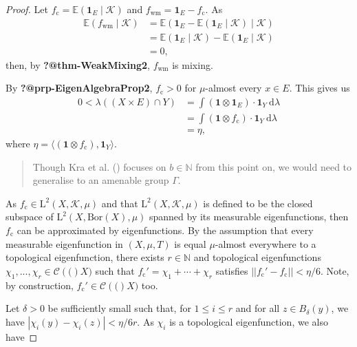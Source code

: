 \documentclass[
  british,
]{article}
\theoremstyle{plain}
\theoremstyle{plain}
\theoremstyle{plain}
\theoremstyle{definition}
\theoremstyle{remark}
\newcommand{\AmenableGroup}{{\Gamma}}
\newcommand{\Borel}[1]{{\text{Bor}({#1})}}
\newcommand{\ContinuousFunctionSpace}[1]{{\mathscr{C}({#1})}}
\newcommand{\Measure}{{\mu}}
\newcommand{\SigmaAlgebra}[1]{{\mathscr{#1}}}
\newcommand{\EigenAlgebra}{{\SigmaAlgebra{K}}}
\begin{document}
\begin{proof}
Let \(f_\text{c}=\mathbb{E}(\boldsymbol{1}_E\mid\EigenAlgebra)\) and
\(f_\text{wm}=\boldsymbol{1}_E-f_\text{c}\). As \begin{align*}
  \mathbb{E}(f_\text{wm}\mid\EigenAlgebra)&=\mathbb{E}(\boldsymbol{1}_E-\mathbb{E}(\boldsymbol{1}_E\mid\EigenAlgebra)\mid\EigenAlgebra)
  \\&=\mathbb{E}(\boldsymbol{1}_E\mid\EigenAlgebra)-\mathbb{E}(\boldsymbol{1}_E\mid\EigenAlgebra)
  \\&=0,
\end{align*} then, by \textbf{?@thm-WeakMixing2}, \(f_\text{wm}\) is
mixing.

By \textbf{?@prp-EigenAlgebraProp2}, \(f_\text{c}>0\) for
\(\Measure\)-almost every \(x\in E\). This gives us \begin{align*}
  0<\lambda\left((X\times E)\cap Y\right)&=\int(\boldsymbol{1}\otimes\boldsymbol{1}_E)\cdot\boldsymbol{1}_Y\ \mathrm{d}\lambda
  \\&=\int(\boldsymbol{1}\otimes f_\text{c})\cdot\boldsymbol{1}_Y\ \mathrm{d}\lambda
  \\&=\eta,
\end{align*} where
\(\eta=\langle(\boldsymbol{1}\otimes f_\text{c}),\boldsymbol{1}_Y \rangle\).

\begin{quote}
Though Kra et al. () focuses on
\(b\in\mathbb{N}\) from this point on, we would need to generalise to an
amenable group \(\AmenableGroup\).
\end{quote}

As \(f_\text{c}\in\text{L}^2(X,\EigenAlgebra,\Measure)\) and that
\(\text{L}^2(X,\EigenAlgebra,\Measure)\) is defined to be the closed
subspace of \(\text{L}^2(X,\Borel{X},\Measure)\) spanned by its
measurable eigenfunctions, then \(f_\text{c}\) can be approximated by
eigenfunctions. By the assumption that every measurable eigenfunction in
\((X,\Measure,T)\) is equal \(\Measure\)-almost everywhere to a
topological eigenfunction, there exists \(r\in\mathbb{N}\) and
topological eigenfunctions
\(\chi_1,...,\chi_r\in\ContinuousFunctionSpace(X)\) such that
\(f_\text{c}'=\chi_1+\cdots+\chi_r\) satisfies
\(||f_\text{c}'-f_\text{c}||<\eta/6\). Note, by construction,
\(f_\text{c}'\in\ContinuousFunctionSpace(X)\) too.

Let \(\delta>0\) be sufficiently small such that, for \(1\leq i\leq r\)
and for all \(z\in B_\delta(y)\), we have
\(|\chi_i(y)-\chi_i(z)|<\eta/6r\). As \(\chi_i\) is a topological
eigenfunction, we also have
\end{proof}
\end{document}
